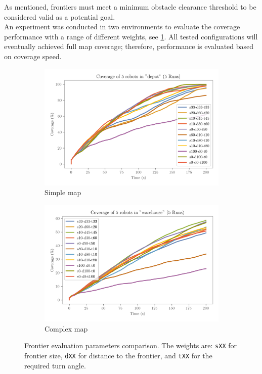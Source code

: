 As mentioned, frontiers must meet a minimum obstacle clearance threshold to be considered valid as a potential goal.\\

An experiment was conducted in two environments to evaluate the coverage performance with a range of different weights, see \cref{fig:frontier-eval-params}. 
All tested configurations will eventually achieved full map coverage; therefore, performance is evaluated based on coverage speed.
\begin{figure}[H]
    \centering
    \begin{subfigure}[b]{0.49\textwidth}
        \centering
        \includegraphics[width=\textwidth]{figures/frontier_eval_params_depot.png}
        \caption{Simple map}
    \end{subfigure}
    \begin{subfigure}[b]{0.49\textwidth}
        \centering
        \includegraphics[width=\textwidth]{figures/frontier_eval_params_warehouse.png}
        \caption{Complex map}
    \end{subfigure}
    \caption{Frontier evaluation parameters comparison. The weights are: \texttt{sXX} for frontier size, \texttt{dXX} for distance to the frontier, and \texttt{tXX} for the required turn angle.}
    \label{fig:frontier-eval-params}
\end{figure}

